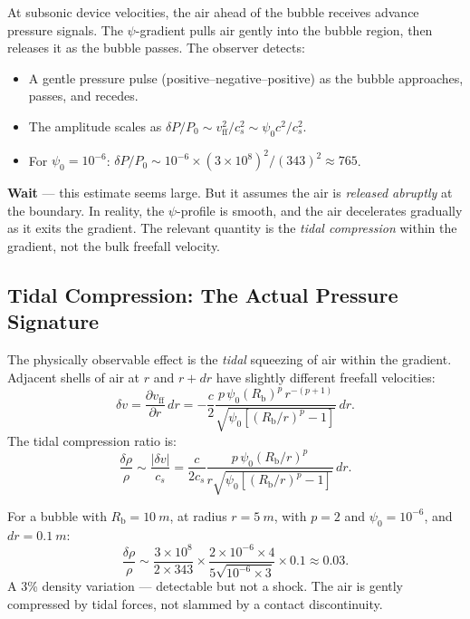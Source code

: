 \documentclass[12pt, letterpaper]{article}
\theoremstyle{definition}
\theoremstyle{remark}
\newcommand{\Rbub}{R_{\mathrm{b}}}
\newcommand{\cs}{c_s}
\begin{document}
At subsonic device velocities, the air ahead of the bubble receives advance
pressure signals. The $\psi$-gradient pulls air gently into the bubble region,
then releases it as the bubble passes. The observer detects:
\begin{itemize}
\item A gentle pressure pulse (positive--negative--positive) as the bubble
approaches, passes, and recedes.
\item The amplitude scales as $\delta P / P_0 \sim v_{\mathrm{ff}}^2 / \cs^2
\sim \psi_0 c^2 / \cs^2$.
\item For $\psi_0 = 10^{-6}$:
$\delta P / P_0 \sim 10^{-6} \times (3 \times 10^8)^2 / (343)^2 \approx 765$.
\end{itemize}

\textbf{Wait} --- this estimate seems large. But it assumes the air is
\emph{released abruptly} at the boundary. In reality, the $\psi$-profile
is smooth, and the air decelerates gradually as it exits the gradient. The
relevant quantity is the \emph{tidal compression} within the gradient, not the
bulk freefall velocity.

\subsection{Tidal Compression: The Actual Pressure Signature}

The physically observable effect is the \emph{tidal} squeezing of air within
the gradient. Adjacent shells of air at $r$ and $r + dr$ have slightly
different freefall velocities:
\begin{equation}
\delta v = \frac{\partial v_{\mathrm{ff}}}{\partial r}\,dr
= -\frac{c}{2}\frac{p\,\psi_0(\Rbub)^p\,r^{-(p+1)}}
{\sqrt{\psi_0\left[(\Rbub/r)^p - 1\right]}}\,dr.
\label{eq:tidal-dv}
\end{equation}
The tidal compression ratio is:
\begin{equation}
\frac{\delta\rho}{\rho} \sim \frac{|\delta v|}{\cs}
= \frac{c}{2\cs}\frac{p\,\psi_0(\Rbub/r)^p}{r\sqrt{\psi_0[(\Rbub/r)^p - 1]}}\,dr.
\label{eq:tidal-compression}
\end{equation}

For a bubble with $\Rbub = \SI{10}{m}$, at radius $r = \SI{5}{m}$, with
$p = 2$ and $\psi_0 = 10^{-6}$, and $dr = \SI{0.1}{m}$:
\begin{equation}
\frac{\delta\rho}{\rho} \sim \frac{3 \times 10^8}{2 \times 343}
\times \frac{2 \times 10^{-6} \times 4}{5\sqrt{10^{-6} \times 3}}
\times 0.1
\approx 0.03.
\end{equation}
A 3\% density variation --- detectable but not a shock. The air is gently
compressed by tidal forces, not slammed by a contact discontinuity.
\end{document}
